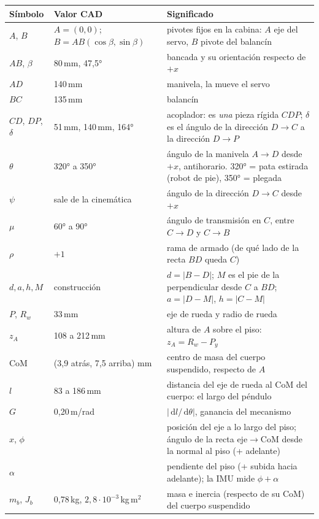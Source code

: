 \documentclass[11pt,a4paper]{article}
\newcommand{\dd}{\,\mathrm{d}}
\begin{document}
\begin{table}[H]
  \centering\small
  \begin{tabular}{llp{9.2cm}}
    \toprule
    Símbolo & Valor CAD & Significado \\
    \midrule
    $A$, $B$ & $A=(0,0)$; $B = AB(\cos\beta,\sin\beta)$ & pivotes fijos en la cabina: $A$ eje del servo, $B$ pivote del balancín \\
    $AB$, $\beta$ & 80\,mm, 47{,}5° & bancada y su orientación respecto de $+x$ \\
    $AD$ & 140\,mm & manivela, la mueve el servo \\
    $BC$ & 135\,mm & balancín \\
    $CD$, $DP$, $\delta$ & 51\,mm, 140\,mm, 164° & acoplador: es \emph{una} pieza rígida $CDP$; $\delta$ es el ángulo de la dirección $D\!\to\!C$ a la dirección $D\!\to\!P$ \\
    $\theta$ & 320° a 350° & ángulo de la manivela $A\!\to\!D$ desde $+x$, antihorario. 320° = pata estirada (robot de pie), 350° = plegada \\
    $\psi$ & sale de la cinemática & ángulo de la dirección $D\!\to\!C$ desde $+x$ \\
    $\mu$ & 60° a 90° & ángulo de transmisión en $C$, entre $C\!\to\!D$ y $C\!\to\!B$ \\
    $\rho$ & $+1$ & rama de armado (de qué lado de la recta $BD$ queda $C$) \\
    $d, a, h, M$ & construcción & $d = |B-D|$; $M$ es el pie de la perpendicular desde $C$ a $BD$; $a = |D-M|$, $h = |C-M|$ \\
    $P$, $R_w$ & 33\,mm & eje de rueda y radio de rueda \\
    $z_A$ & 108 a 212\,mm & altura de $A$ sobre el piso: $z_A = R_w - P_y$ \\
    $\mathrm{CoM}$ & (3{,}9 atrás, 7{,}5 arriba) mm & centro de masa del cuerpo suspendido, respecto de $A$ \\
    $l$ & 83 a 186\,mm & distancia del eje de rueda al CoM del cuerpo: el largo del péndulo \\
    $G$ & 0{,}20\,m/rad & $|\dd l/\dd\theta|$, ganancia del mecanismo \\
    \midrule
    $x$, $\phi$ & & posición del eje a lo largo del piso; ángulo de la recta eje$\to$CoM desde la normal al piso (+ adelante) \\
    $\alpha$ & & pendiente del piso (+ subida hacia adelante); la IMU mide $\phi+\alpha$ \\
    $m_b$, $J_b$ & 0{,}78\,kg, $2{,}8\cdot10^{-3}$\,kg\,m$^2$ & masa e inercia (respecto de su CoM) del cuerpo suspendido \\

\end{tabular}
\end{table}
\end{document}

